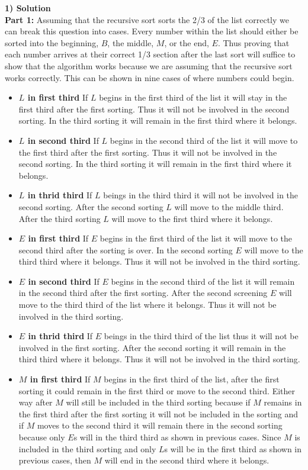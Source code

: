 \documentclass[11pt]{article}
\begin{document}
\textbf{1) Solution}\\
\textbf{Part 1:} Assuming that the recursive sort sorts the 2/3 of the list correctly we can break this question into cases. Every number within the list should either be sorted into the beginning, $B$, the middle, $M$, or the end, $E$. Thus proving that each number arrives at their correct 1/3 section after the last sort will suffice to show that the algorithm works because we are assuming that the recursive sort works correctly. This can be shown in nine cases of where numbers could begin.
\begin{itemize}
\item \textbf{$L$ in first third} If $L$ begins in the first third of the list it will stay in the first third after the first sorting. Thus it will not be involved in the second sorting. In the third sorting it will remain in the first third where it belongs.
\item \textbf{$L$ in second third} If $L$ begins in the second third of the list it will move to the first third after the first sorting. Thus it will not be involved in the second sorting. In the third sorting it will remain in the first third where it belongs.
\item \textbf{$L$ in thrid third} If $L$ beings in the third third it will not be involved in the second sorting. After the second sorting $L$ will move to the middle third. After the third sorting $L$ will move to the first third where it belongs. 
\item \textbf{$E$ in first third} If $E$ begins in the first third of the list it will move to the second third after the sorting is over. In the second sorting $E$ will move to the third third where it belongs. Thus it will not be involved in the third sorting.
\item \textbf{$E$ in second third} If $E$ begins in the second third of the list it will remain in the second third after the first sorting. After the second screening $E$ will move to the third third of the list where it belongs. Thus it will not be involved in the third sorting.
\item \textbf{$E$ in thrid third} If $E$ beings in the third third of the list thus it will not be involved in the first sorting. After the second sorting it will remain in the third third where it belongs. Thus it will not be involved in the third sorting.
\item \textbf{$M$ in first third} If $M$ begins in the first third of the list, after the first sorting it could remain in the first third or move to the second third. Either way after $M$ will still be included in the third sorting because if $M$ remains in the first third after the first sorting it will not be included in the sorting and if $M$ moves to the second third it will remain there in the second sorting because only $E$s will in the third third as shown in previous cases. Since $M$ is included in the third sorting and only $L$s will be in the first third as shown in previous cases, then $M$ will end in the second third where it belongs.

\end{itemize}
\end{document}
